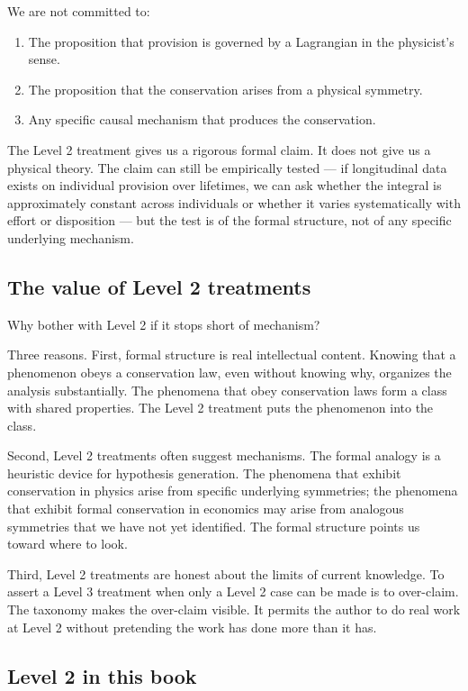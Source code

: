We are not committed to:

\begin{enumerate}[leftmargin=2em]
    \item The proposition that provision is governed by a Lagrangian
    in the physicist's sense.
    \item The proposition that the conservation arises from a
    physical symmetry.
    \item Any specific causal mechanism that produces the
    conservation.
\end{enumerate}

The Level 2 treatment gives us a rigorous formal claim. It does not
give us a physical theory. The claim can still be empirically
tested --- if longitudinal data exists on individual provision over
lifetimes, we can ask whether the integral is approximately constant
across individuals or whether it varies systematically with effort or
disposition --- but the test is of the formal structure, not of any
specific underlying mechanism.

\subsection{The value of Level 2 treatments}

Why bother with Level 2 if it stops short of mechanism?

Three reasons. First, formal structure is real intellectual content.
Knowing that a phenomenon obeys a conservation law, even without
knowing why, organizes the analysis substantially. The phenomena that
obey conservation laws form a class with shared properties. The
Level 2 treatment puts the phenomenon into the class.

Second, Level 2 treatments often suggest mechanisms. The formal
analogy is a heuristic device for hypothesis generation. The
phenomena that exhibit conservation in physics arise from specific
underlying symmetries; the phenomena that exhibit formal conservation
in economics may arise from analogous symmetries that we have not
yet identified. The formal structure points us toward where to look.

Third, Level 2 treatments are honest about the limits of current
knowledge. To assert a Level 3 treatment when only a Level 2 case
can be made is to over-claim. The taxonomy makes the over-claim
visible. It permits the author to do real work at Level 2 without
pretending the work has done more than it has.

\subsection{Level 2 in this book}

